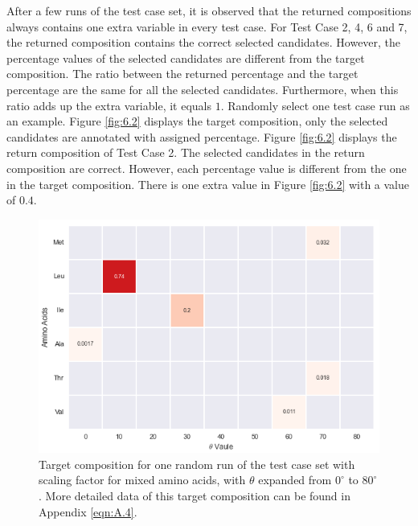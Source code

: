 After a few runs of the test case set, it is observed that the returned compositions always contains one extra variable in every test case. For Test Case 2, 4, 6 and 7, the returned composition contains the correct selected candidates. However, the percentage values of the selected candidates are different from the target composition. The ratio between the returned percentage and the target percentage are the same for all the selected candidates. Furthermore, when this ratio adds up the extra variable, it equals $1$. Randomly select one test case run as an example. Figure \ref{fig:6.2} displays the target composition, only the selected candidates are annotated with assigned percentage. Figure \ref{fig:6.2} displays the return composition of Test Case 2. The selected candidates in the return composition are correct. However, each percentage value is different from the one in the target composition. There is one extra value in Figure \ref{fig:6.2} with a value of $0.4$. \\

\begin{figure}[!ht] 
\centering
\includegraphics[scale=0.9]{Figures/chapter6_figure_one.png}
\caption{Target composition for one random run of the test case set with scaling factor for mixed amino acids, with $\theta$ expanded from $0^{\circ}$ to $80^{\circ}$. More detailed data of this target composition can be found in Appendix \ref{eqn:A.4}.} \label{fig:6.1}
\end{figure}

